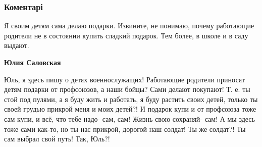  
 
 
 
 
\subsubsection{Коментарі}
\label{sec:26_11_2021.fb.poltorackaja_irina.dnr.1.dyrka_ot_bublika.cmt}

\begin{itemize} %

Я своим детям сама делаю подарки. Извините, не понимаю, почему работающие
родители не в состоянии купить сладкий подарок. Тем более, в школе и в саду
выдают.

\textbf{Юлия Саловская} 

Юль, я здесь пишу о детях военнослужащих! Работающие родители приносят детям
подарки от профсоюзов, а наши бойцы? Сами делают покупают! Т. е. ты стой под
пулями, а я буду жить и работать, я буду растить своих детей, только ты своей
грудью прикрой меня и моих детей?! И подарок купи и от профсоюза тоже сам купи,
и всё, что тебе надо- сам, сам! Жизнь свою сохраняй- сам! А мы здесь тоже сами
как-то, но ты нас прикрой, дорогой наш солдат! Ты же солдат?! Ты сам выбрал
свой путь! Так, Юль?!

\end{itemize} %
